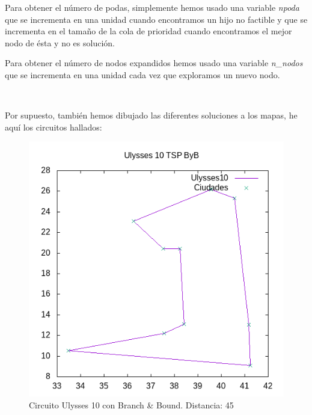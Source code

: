 \documentclass{article}
\begin{document}
	Para obtener el número de podas, simplemente hemos usado una variable \textit{npoda} que se incrementa en una unidad cuando encontramos un hijo no factible y que se incrementa en el tamaño de la cola de prioridad cuando encontramos el mejor nodo de ésta y no es solución.
	\
	
	Para obtener el número de nodos expandidos hemos usado una variable \textit{n\_nodos} que se incrementa en una unidad cada vez que exploramos un nuevo nodo.
	
	\
	
	Por supuesto, también hemos dibujado las diferentes soluciones a los mapas, he aquí los circuitos hallados:
	
	\begin{figure}[H]
		\centering
		\includegraphics[totalheight=6cm]{ulysses10byb}
		\caption{Circuito Ulysses 10 con Branch \& Bound. Distancia: 45}
		\label{fig:u10byb}
	\end{figure}
\end{document}
